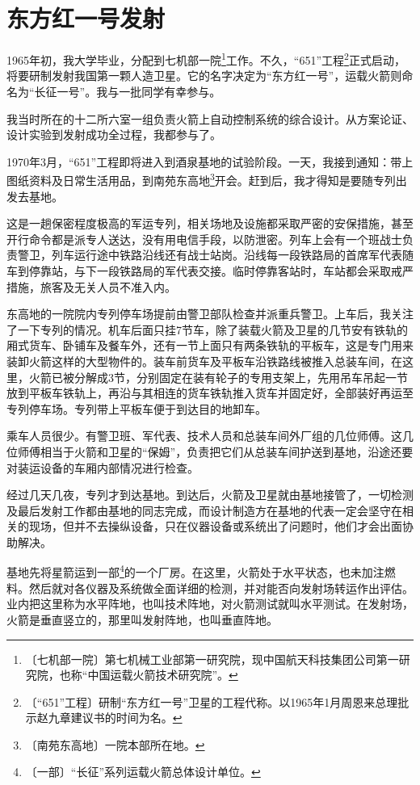 \documentclass[12pt,UTF-8,openany]{ctexbook}
\begin{document}
\chapter{东方红一号发射}

\begin{normalsize}
    
    1965年初，我大学毕业，分配到七机部一院\footnote{〔七机部一院〕第七机械工业部第一研究院，现中国航天科技集团公司第一研究院，也称“中国运载火箭技术研究院”。}工作。不久，“651”工程\footnote{〔“651”工程〕研制“东方红一号”卫星的工程代称。以1965年1月周恩来总理批示赵九章建议书的时间为名。}正式启动，将要研制发射我国第一颗人造卫星。它的名字决定为“东方红一号”，运载火箭则命名为“长征一号”。我与一批同学有幸参与。
    
    我当时所在的十二所六室一组负责火箭上自动控制系统的综合设计。从方案论证、设计实验到发射成功全过程，我都参与了。
    
    1970年3月，“651”工程即将进入到酒泉基地的试验阶段。一天，我接到通知：带上图纸资料及日常生活用品，到南苑东高地\footnote{〔南苑东高地〕一院本部所在地。}开会。赶到后，我才得知是要随专列出发去基地。
    
    这是一趟保密程度极高的军运专列，相关场地及设施都采取严密的安保措施，甚至开行命令都是派专人送达，没有用电信手段，以防泄密。列车上会有一个班战士负责警卫，列车运行途中铁路沿线还有战士站岗。沿线每一段铁路局的首席军代表随车到停靠站，与下一段铁路局的军代表交接。临时停靠客站时，车站都会采取戒严措施，旅客及无关人员不准入内。
    
    东高地的一院院内专列停车场提前由警卫部队检查并派重兵警卫。上车后，我关注了一下专列的情况。机车后面只挂7节车，除了装载火箭及卫星的几节安有铁轨的厢式货车、卧铺车及餐车外，还有一节上面只有两条铁轨的平板车，这是专门用来装卸火箭这样的大型物件的。装车前货车及平板车沿铁路线被推入总装车间，在这里，火箭已被分解成3节，分别固定在装有轮子的专用支架上，先用吊车吊起一节放到平板车铁轨上，再沿与其相连的货车铁轨推入货车并固定好，全部装好再运至专列停车场。专列带上平板车便于到达目的地卸车。
    
    乘车人员很少。有警卫班、军代表、技术人员和总装车间外厂组的几位师傅。这几位师傅相当于火箭和卫星的“保姆”，负责把它们从总装车间护送到基地，沿途还要对装运设备的车厢内部情况进行检查。
    
    经过几天几夜，专列才到达基地。到达后，火箭及卫星就由基地接管了，一切检测及最后发射工作都由基地的同志完成，而设计制造方在基地的代表一定会坚守在相关的现场，但并不去操纵设备，只在仪器设备或系统出了问题时，他们才会出面协助解决。
    
    基地先将星箭运到一部\footnote{〔一部〕“长征”系列运载火箭总体设计单位。}的一个厂房。在这里，火箭处于水平状态，也未加注燃料。然后就对各仪器及系统做全面详细的检测，并对能否向发射场转运作出评估。业内把这里称为水平阵地，也叫技术阵地，对火箭测试就叫水平测试。在发射场，火箭是垂直竖立的，那里叫发射阵地，也叫垂直阵地。
    

\end{normalsize}
\end{document}
